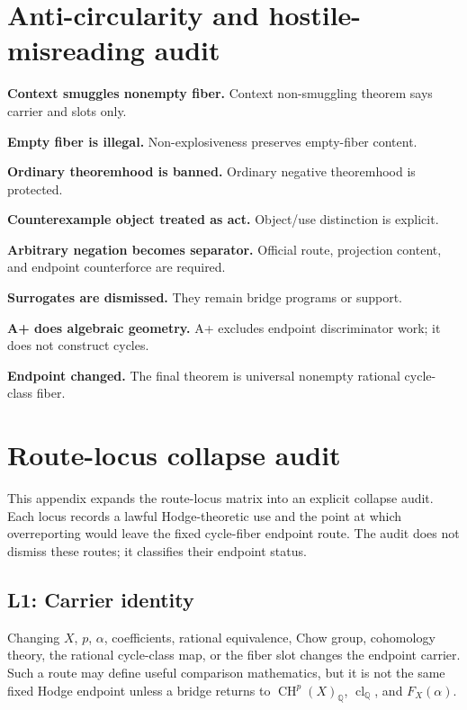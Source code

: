 \documentclass[11pt]{article}
\newcommand{\QQ}{\mathbb{Q}}
\newcommand{\CH}{\operatorname{CH}}
\newcommand{\clQ}{\operatorname{cl}_{\QQ}}
\begin{document}
\section{Anti-circularity and hostile-misreading audit}\label{app:anti-circularity}


\par\noindent\textbf{Context smuggles nonempty fiber.} Context non-smuggling theorem says carrier and slots only.


\par\noindent\textbf{Empty fiber is illegal.} Non-explosiveness preserves empty-fiber content.


\par\noindent\textbf{Ordinary theoremhood is banned.} Ordinary negative theoremhood is protected.


\par\noindent\textbf{Counterexample object treated as act.} Object/use distinction is explicit.


\par\noindent\textbf{Arbitrary negation becomes separator.} Official route, projection content, and endpoint counterforce are required.


\par\noindent\textbf{Surrogates are dismissed.} They remain bridge programs or support.


\par\noindent\textbf{A+ does algebraic geometry.} A+ excludes endpoint discriminator work; it does not construct cycles.


\par\noindent\textbf{Endpoint changed.} The final theorem is universal nonempty rational cycle-class fiber.



\section{Route-locus collapse audit}\label{app:route-loci}

This appendix expands the route-locus matrix into an explicit collapse audit.  Each locus records a lawful Hodge-theoretic use and the point at which overreporting would leave the fixed cycle-fiber endpoint route.  The audit does not dismiss these routes; it classifies their endpoint status.

\subsection*{L1: Carrier identity}
Changing $X$, $p$, $\alpha$, coefficients, rational equivalence, Chow group, cohomology theory, the rational cycle-class map, or the fiber slot changes the endpoint carrier.  Such a route may define useful comparison mathematics, but it is not the same fixed Hodge endpoint unless a bridge returns to $\CH^p(X)_\QQ$, $\clQ$, and $F_X(\alpha)$.
\end{document}
